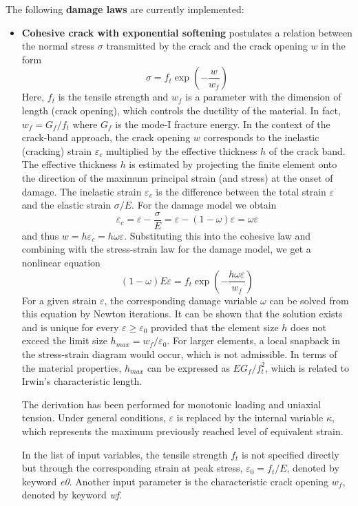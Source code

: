 \documentclass[a4paper]{article}
\begin{document}
The following {\bf damage laws} are currently implemented:
\begin{itemize}
\item
{\bf Cohesive crack with exponential softening} postulates a relation
between the normal stress $\sigma$ transmitted by the crack and the
crack opening $w$ in the form
$$
\sigma = f_t\exp\left(-\frac{w}{w_f}\right)
$$
Here, $f_t$ is the tensile strength and $w_f$ is a parameter with the dimension
of length (crack opening), which controls the ductility of the material.
In fact, $w_f=G_f/f_t$ where $G_f$ is the mode-I fracture energy.
In the context of the crack-band approach, the crack opening $w$ corresponds
to the inelastic (cracking) strain $\varepsilon_c$ 
multiplied by the effective thickness $h$ of the 
crack band. The effective thickness $h$ is estimated by projecting the finite
element onto the direction of the maximum principal strain (and stress)
at the onset of damage. The inelastic strain $\varepsilon_c$
is the difference between
the total strain $\varepsilon$ and the elastic strain $\sigma/E$.
For the damage model we obtain
$$
\varepsilon_c = \varepsilon - \frac{\sigma}{E} =
\varepsilon - (1-\omega)\varepsilon = \omega\varepsilon
$$
and thus $w=h\varepsilon_c=h\omega\varepsilon$. Substituting this into
the cohesive law and combining with the stress-strain law for the damage
model, we get a nonlinear equation
$$
(1-\omega)E\varepsilon = f_t\exp\left(-\frac{h\omega\varepsilon}{w_f}\right)
$$
For a given strain $\varepsilon$, the corresponding damage variable $\omega$
can be solved from this equation by Newton iterations. 
It can be shown that the solution exists and is unique for every
$\varepsilon\ge\varepsilon_0$ provided that the element size $h$ does not
exceed the limit size $h_{max}=w_f/\varepsilon_0$. For larger elements,
a local snapback in the stress-strain diagram would occur, which is not
admissible. In terms of the material properties, $h_{max}$ can be expressed
as $EG_f/f_t^2$, which is related to Irwin's characteristic length.

The derivation
has been performed for monotonic loading and uniaxial tension. Under general
conditions, $\varepsilon$ is replaced by the internal variable $\kappa$,
which represents the maximum previously reached level of equivalent strain.

In the list of input variables, the tensile strength $f_t$ is not specified
directly but through the corresponding strain at peak stress, 
$\varepsilon_0=f_t/E$, denoted by keyword {\it e0}. Another input parameter
is the characteristic crack opening $w_f$, denoted by keyword {\it wf}.


\end{itemize}
\end{document}
